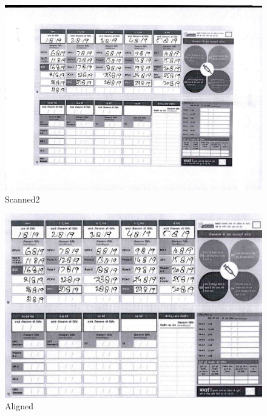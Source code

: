 \documentclass{article}
\begin{document}
\pagebreak
    \begin{figure}[!htb]
    \minipage{\textwidth}
    \begin{center}
      \includegraphics[scale=.25]{4/.report/_orig/s2.jpg}
      \caption{Scanned2}
    \end{center}
    \endminipage
    \end{figure}
    \begin{figure}[!htb]
    \minipage{\textwidth}
    \begin{center}
      \includegraphics[scale=.2]{4/.report/_aligned/s2.jpg}
      \caption{Aligned}
    \end{center}
    \endminipage
    \end{figure}
\end{document}
